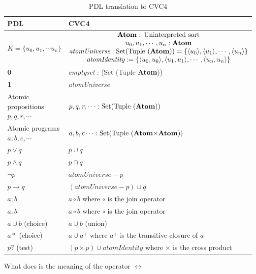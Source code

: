 \documentclass[12pt,a4paper]{article}
\begin{document}
\begin{table}
\begin{center}
\begin{tabular}{ll} 
\toprule
PDL & CVC4 \\    
\midrule    
$K=\lbrace u_0, u_1, \cdots u_n \rbrace$ &  
$\begin{matrix}
\text{\textbf{Atom} : \text{Uninterpreted sort}} \\
u_0, u_1, \cdots, u_n: \textbf{Atom} \\
\textit{atomUniverse}: \text{Set(Tuple (\textbf{Atom}))} = \lbrace \langle u_0 \rangle, \langle u_1 \rangle, \cdots , \langle u_n \rangle \rbrace \\
\textit{atomIdentity}:  = \lbrace \langle u_0, u_0 \rangle, \langle u_1, u_1 \rangle, \cdots , \langle u_n, u_n \rangle \rbrace \\
\end{matrix}$ \\ \midrule   
\textbf{0} & \textit{emptyset} : (Set (Tuple \textbf{Atom})) \\
\textbf{1} & \textit{atomUniverse} \\
Atomic propositions $p, q, r, \cdots$ & $p, q, r, \cdots : \text{Set(Tuple (\textbf{Atom}))}$ \\
Atomic programs $a, b, c, \cdots$ & $a, b, c \cdots : \text{Set(Tuple (\textbf{Atom}$\times$\textbf{Atom}))}$ \\
$p \vee q$ & $p \cup q$ \\
$p \wedge q$ & $p \cap q$ \\
$\neg p$ & $\textit{atomUniverse} - p$ \\
$p \rightarrow q$ & $(\textit{atomUniverse}- p)\cup q$ \\
$a;b$ & $a \circ b$ where $\circ$ is the join operator\\
$a;b$ & $a \circ b$ where $\circ$ is the join operator\\
$a \cup b$ (choice) & $a \cup b$ (union)\\
$a*$ (choice) & $a \cup a^+$  where $a^+$ is the transitive closure of $a$\\
$p?$ (test) & $(p \times p) \cup \textit{atomIdentity}$ where $\times$ is the cross product\\
\bottomrule
\end{tabular}
\end{center}
\caption{PDL translation to CVC4} \label{tab:translation}
\end{table}

What does is the meaning of the operator $\leftrightarrow$
\end{document}
